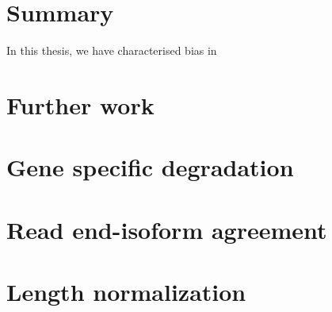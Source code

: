 
\section{Summary}

In this thesis, we have characterised bias in 


\section{Further work}

\section{Gene specific degradation}

\section{Read end-isoform agreement}

\section{Length normalization}


